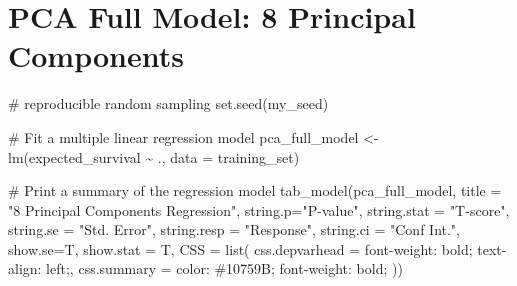 \documentclass[
  letterpaper,
  DIV=11,
  numbers=noendperiod]{scrreprt}
\newenvironment{Shaded}{\begin{snugshade}}{\end{snugshade}}
\newcommand{\AttributeTok}[1]{\textcolor[rgb]{0.40,0.45,0.13}{#1}}
\newcommand{\CommentTok}[1]{\textcolor[rgb]{0.37,0.37,0.37}{#1}}
\newcommand{\FunctionTok}[1]{\textcolor[rgb]{0.28,0.35,0.67}{#1}}
\newcommand{\NormalTok}[1]{\textcolor[rgb]{0.00,0.23,0.31}{#1}}
\newcommand{\OtherTok}[1]{\textcolor[rgb]{0.00,0.23,0.31}{#1}}
\newcommand{\SpecialCharTok}[1]{\textcolor[rgb]{0.37,0.37,0.37}{#1}}
\newcommand{\StringTok}[1]{\textcolor[rgb]{0.13,0.47,0.30}{#1}}
\begin{document}
\hypertarget{pca-full-model-8-principal-components}{%
\section{PCA Full Model: 8 Principal
Components}\label{pca-full-model-8-principal-components}}

\begin{Shaded}
\begin{Highlighting}[]
\CommentTok{\# reproducible random sampling}
\FunctionTok{set.seed}\NormalTok{(my\_seed)}

\CommentTok{\# Fit a multiple linear regression model}
\NormalTok{pca\_full\_model }\OtherTok{\textless{}{-}} \FunctionTok{lm}\NormalTok{(expected\_survival }\SpecialCharTok{\textasciitilde{}}\NormalTok{ ., }\AttributeTok{data =}\NormalTok{ training\_set)}

\CommentTok{\# Print a summary of the regression model}
\FunctionTok{tab\_model}\NormalTok{(pca\_full\_model, }\AttributeTok{title =} \StringTok{"8 Principal Components Regression"}\NormalTok{,}
          \AttributeTok{string.p=}\StringTok{"P{-}value"}\NormalTok{, }\AttributeTok{string.stat =} \StringTok{"T{-}score"}\NormalTok{,}
          \AttributeTok{string.se =} \StringTok{"Std. Error"}\NormalTok{,}
          \AttributeTok{string.resp =} \StringTok{"Response"}\NormalTok{,}
          \AttributeTok{string.ci =} \StringTok{"Conf Int."}\NormalTok{,}
          \AttributeTok{show.se=}\NormalTok{T, }\AttributeTok{show.stat =}\NormalTok{ T,}
          \AttributeTok{CSS =} \FunctionTok{list}\NormalTok{(}
             \AttributeTok{css.depvarhead =} \StringTok{\textquotesingle{}font{-}weight: bold; text{-}align: left;\textquotesingle{}}\NormalTok{,}
             \AttributeTok{css.summary =} \StringTok{\textquotesingle{}color: \#10759B; font{-}weight: bold;\textquotesingle{}}
\NormalTok{           ))}
\end{Highlighting}
\end{Shaded}
\end{document}
